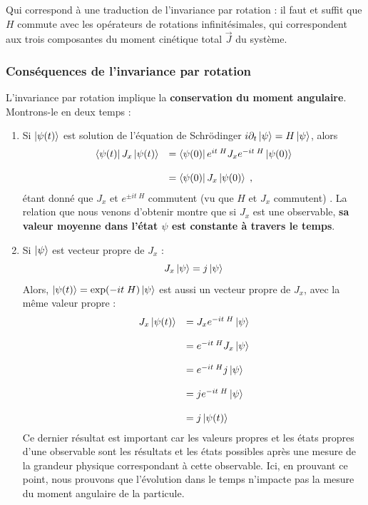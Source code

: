\documentclass[../notesdecours.tex]{subfiles}
\begin{document}
Qui correspond à une traduction de l'invariance par rotation : il faut et suffit que $H$ commute avec les opérateurs de rotations infinitésimales, qui correspondent aux trois composantes du moment cinétique total $\vec J$ du système.

\subsubsection{Conséquences de l'invariance par rotation}
L'invariance par rotation implique la \textbf{conservation du moment angulaire}. Montrons-le en deux temps :
\begin{enumerate}
    \item Si $\ket{\psi(t)}$ est solution de l'équation de Schrödinger $i\partial_t \ket\psi = H\ket\psi$, alors 
    $$\begin{array}{ll}
        \bra{\psi(t)}J_x\ket{\psi(t)} &= \bra{\psi(0)} e^{it\; H} J_x e^{-it\; H}\ket{\psi(0)} \\
        \strut \\
        &= \bra{\psi(0)}J_x\ket{\psi(0)} \; ,
    \end{array}$$ 
    étant donné que $J_x$ et $e^{\pm it\; H}$ commutent (vu que $H$ et $J_x$ commutent) {\color{red}{je ne suis pas sûr de cette justification}}. La relation que nous venons d'obtenir montre que si $J_x$ est une observable, \textbf{sa valeur moyenne dans l'état $\psi$ est constante à travers le temps}.

    \item Si $\ket \psi$ est vecteur propre de $J_x$ :
    $$J_x\ket \psi = j \ket \psi$$
    Alors, $\ket{\psi(t)} = \exp(-it\; H)\ket\psi$ est aussi un vecteur propre de $J_x$, avec la même valeur propre :
    $$
    \begin{array}{ll}
        J_x \ket{\psi(t)} &= J_x e^{-it\; H}\ket\psi\\
        \strut \\
        &= e^{-it\; H}J_x \ket \psi \\
        \strut \\
        &= e^{-it\; H} j\ket \psi \\
        \strut \\
        &= j e^{-it\; H}\ket\psi \\
        \strut \\
        &= j \ket{\psi(t)}
    \end{array}
    $$
    Ce dernier résultat est important car les valeurs propres et les états propres d'une observable sont les résultats et les états possibles après une mesure de la grandeur physique correspondant à cette observable. Ici, en prouvant ce point, nous prouvons que l'évolution dans le temps n'impacte pas la mesure du moment angulaire de la particule.
\end{enumerate}
\end{document}
